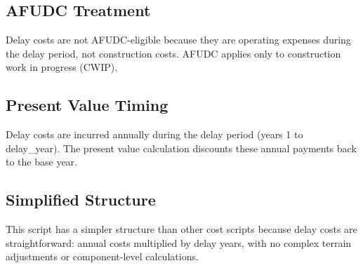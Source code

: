 \documentclass[ctcc_full_documentation.tex]{subfiles}
\begin{document}
\subsection{AFUDC Treatment}

Delay costs are not AFUDC-eligible because they are operating expenses during the delay period, not construction costs. AFUDC applies only to construction work in progress (CWIP).

\subsection{Present Value Timing}

Delay costs are incurred annually during the delay period (years 1 to delay\_year). The present value calculation discounts these annual payments back to the base year.

\subsection{Simplified Structure}

This script has a simpler structure than other cost scripts because delay costs are straightforward: annual costs multiplied by delay years, with no complex terrain adjustments or component-level calculations.
\end{document}
